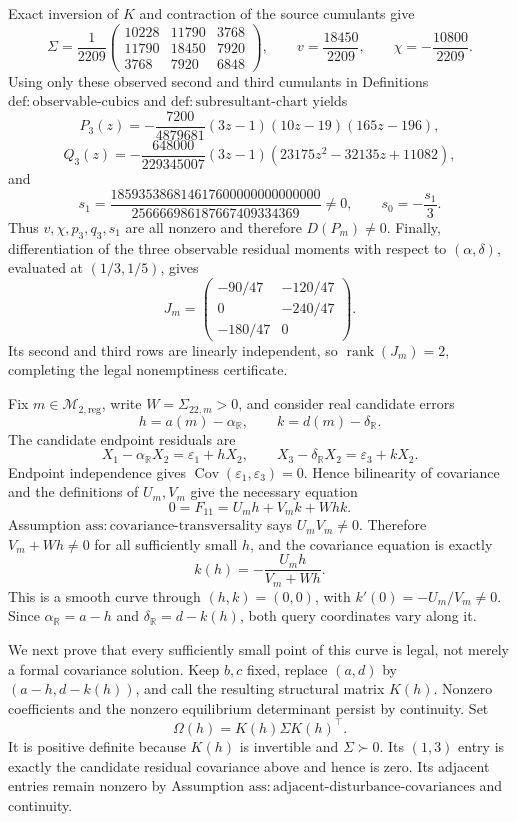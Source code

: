Exact inversion of \(K\) and contraction of the source cumulants give
\[
\Sigma=\frac1{2209}
\begin{pmatrix}
10228&11790&3768\\
11790&18450&7920\\
3768&7920&6848
\end{pmatrix},
\qquad
v=\frac{18450}{2209},
\qquad
\chi=-\frac{10800}{2209}.
\]
Using only these observed second and third cumulants in Definitions \(\mathrm{def:observable\mbox{-}cubics}\) and \(\mathrm{def:subresultant\mbox{-}chart}\) yields
\[
P_3(z)=-\frac{7200}{4879681}(3z-1)(10z-19)(165z-196),
\]
\[
Q_3(z)=-\frac{648000}{229345007}(3z-1)
       (23175z^2-32135z+11082),
\]
and
\[
s_1=\frac{185935386814617600000000000000}
{256666986187667409334369}\neq0,
\qquad
s_0=-\frac{s_1}{3}.
\]
Thus \(v,\chi,p_3,q_3,s_1\) are all nonzero and therefore \(D(P_m)\neq0\). Finally, differentiation of the three observable residual moments with respect to \((\alpha,\delta)\), evaluated at \((1/3,1/5)\), gives
\[
J_m=
\begin{pmatrix}
-90/47&-120/47\\
0&-240/47\\
-180/47&0
\end{pmatrix}.
\]
Its second and third rows are linearly independent, so \(\operatorname{rank}(J_m)=2\), completing the legal nonemptiness certificate.

Fix \(m\in\mathcal M_{2,\mathrm{reg}}\), write \(W=\Sigma_{22,m}>0\), and consider real candidate errors
\[
h=a(m)-\alpha_{\mathbb R},
\qquad
k=d(m)-\delta_{\mathbb R}.
\]
The candidate endpoint residuals are
\[
X_1-\alpha_{\mathbb R}X_2=\varepsilon_1+hX_2,
\qquad
X_3-\delta_{\mathbb R}X_2=\varepsilon_3+kX_2.
\]
Endpoint independence gives \(\operatorname{Cov}(\varepsilon_1,\varepsilon_3)=0\). Hence bilinearity of covariance and the definitions of \(U_m,V_m\) give the necessary equation
\[
0=F_{11}=U_mh+V_mk+Whk.
\]
Assumption \(\mathrm{ass:covariance\mbox{-}transversality}\) says \(U_mV_m\neq0\). Therefore \(V_m+Wh\neq0\) for all sufficiently small \(h\), and the covariance equation is exactly
\[
k(h)=-\frac{U_mh}{V_m+Wh}.
\]
This is a smooth curve through \((h,k)=(0,0)\), with \(k'(0)=-U_m/V_m\neq0\). Since \(\alpha_{\mathbb R}=a-h\) and \(\delta_{\mathbb R}=d-k(h)\), both query coordinates vary along it.

We next prove that every sufficiently small point of this curve is legal, not merely a formal covariance solution. Keep \(b,c\) fixed, replace \((a,d)\) by \((a-h,d-k(h))\), and call the resulting structural matrix \(K(h)\). Nonzero coefficients and the nonzero equilibrium determinant persist by continuity. Set
\[
\Omega(h)=K(h)\Sigma K(h)^\top.
\]
It is positive definite because \(K(h)\) is invertible and \(\Sigma\succ0\). Its \((1,3)\) entry is exactly the candidate residual covariance above and hence is zero. Its adjacent entries remain nonzero by Assumption \(\mathrm{ass:adjacent\mbox{-}disturbance\mbox{-}covariances}\) and continuity.

